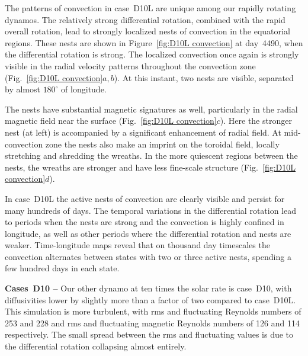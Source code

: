 The patterns of convection in case~D10L are unique among our rapidly
rotating dynamos.  The relatively strong differential rotation,
combined with the rapid overall rotation, lead to strongly localized
nests of convection in the equatorial regions.  These
nests are shown in Figure~\ref{fig:D10L convection} at day~4490, when
the differential rotation is strong.  The localized convection once
again is strongly visible in the radial velocity patterns throughout
the convection zone (Fig.~\ref{fig:D10L convection}$a,b$).  At this
instant, two nests are visible, separated by almost $180^\circ$ of
longitude.  

The nests have substantial magnetic signatures as well,
particularly in the radial magnetic field near the surface
(Fig.~\ref{fig:D10L convection}$c$).  Here the stronger nest (at left)
is accompanied by a significant enhancement of radial field.  At
mid-convection zone the nests also make an imprint on the toroidal
field, locally stretching and shredding the wreaths.  In the more
quiescent regions between the nests, the wreaths are stronger and
have less fine-scale structure (Fig.~\ref{fig:D10L convection}$d$).

In case~D10L the active nests of convection are clearly visible and
persist for many hundreds of days.  The temporal variations in the
differential rotation lead to periods when the nests are strong and
the convection is highly confined in longitude, as well as other
periods where the differential rotation and nests are weaker.
Time-longitude maps reveal that on thousand day timescales the convection
alternates between states with two or three active nests, spending a
few hundred days in each state.



\textbf{Cases~D10 --} Our other dynamo at ten times the solar rate is
case~D10, with diffusivities lower by slightly more than a factor of
two compared to case~D10L.  This simulation is more turbulent, with
rms and fluctuating Reynolds numbers of 253 and 228 and rms and
fluctuating magnetic Reynolds numbers of 126 and 114 respectively.
The small spread between the rms and fluctuating values is due to the
differential rotation collapsing almost entirely.

